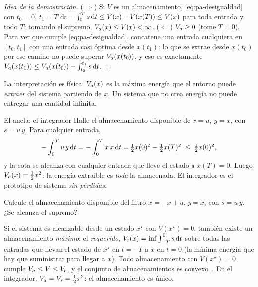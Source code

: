\begin{proof}[Idea de la demostración]
($\Rightarrow$) Si $V$ es un almacenamiento, \eqref{eq:pa-desigualdad} con $t_0=0$, $t_1=T$ da $-\int_0^Ts\,\mathrm{d} t\le V(x)-V(x(T))\le V(x)$ para toda entrada y todo $T$; tomando el supremo, $V_a(x)\le V(x)<\infty$. ($\Leftarrow$) $V_a\ge0$ (tome $T=0$). Para ver que cumple \eqref{eq:pa-desigualdad}, concatene una entrada cualquiera en $[t_0,t_1]$ con una entrada casi óptima desde $x(t_1)$: lo que se extrae desde $x(t_0)$ por ese camino no puede superar $V_a(x(t_0))$, y eso es exactamente $V_a(x(t_1))\le V_a(x(t_0))+\int_{t_0}^{t_1}s\,\mathrm{d} t$.
\end{proof}

La interpretación es física: $V_a(x)$ es la máxima energía que el entorno puede \emph{extraer} del sistema partiendo de $x$. Un sistema que no crea energía no puede entregar una cantidad infinita.

\begin{ejemplo}[label=ej:pa-integrador]{El ancla: el integrador}
Halle el almacenamiento disponible de $\dot x=u$, $y=x$, con $s=u\,y$.
\solucion Para cualquier entrada,
\[
  -\int_0^Tu\,y\,\mathrm{d} t=-\int_0^T\dot x\,x\,\mathrm{d} t=\tfrac12x(0)^2-\tfrac12x(T)^2\;\le\;\tfrac12x(0)^2,
\]
y la cota se alcanza con cualquier entrada que lleve el estado a $x(T)=0$. Luego $V_a(x)=\tfrac12x^2$: la energía extraíble es \emph{toda} la almacenada. El integrador es el prototipo de sistema \emph{sin pérdidas}.
\end{ejemplo}

\begin{pausa}
Calcule el almacenamiento disponible del filtro $\dot x=-x+u$, $y=x$, con $s=u\,y$. ¿Se alcanza el supremo?
\end{pausa}

\begin{profundiza}
Si el sistema es alcanzable desde un estado $x^\star$ con $V(x^\star)=0$, también existe un almacenamiento \emph{máximo}: el \emph{requerido}, $V_r(x)=\inf\int_{-T}^0s\,\mathrm{d} t$ sobre todas las entradas que llevan el estado de $x^\star$ en $t=-T$ a $x$ en $t=0$ (la mínima energía que hay que suministrar para llegar a $x$). Todo almacenamiento con $V(x^\star)=0$ cumple $V_a\le V\le V_r$, y el conjunto de almacenamientos es convexo~\citep{Wil72a,vdS17}. En el integrador, $V_a=V_r=\tfrac12x^2$: el almacenamiento es único.
\end{profundiza}
